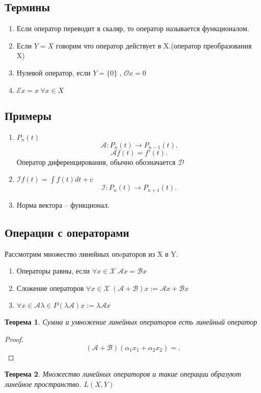 \documentclass{scrartcl}
\newtheorem{theorem}{Теорема}
\begin{document}
\subsection{Термины}
\begin{enumerate}
    \item Если оператор переводит в скаляр, то оператор  называется функционалом.
    \item  Если $Y = X$ говорим что оператор действует в X.(оператор преобразования X)
    \item  Нулевой оператор, если $Y = \{0\}$ ,  $\mathcal{O} x = 0$
    \item  $\mathcal{E} x = x  ~\forall  x \in X$
\end{enumerate}
\subsection{Примеры}
\begin{enumerate}
    \item $P_{n}(t)$
        \[
            \mathcal{A}: P_{n}(t) \to P_{n - 1}(t)
        .\] 
         \[
             \mathcal{A} f(t) = f'(t)
         .\] 
         Оператор диференцирования, обычно обозначается $\mathcal{D}$
         \item  $\mathcal{I} f(t) = \int f(t) dt + c$
             \[
                 \mathcal{I} : P_{n}(t) \to P_{n + 1}(t)
             .\] 
        \item Норма вектора -- функционал.
\end{enumerate}
\subsection{Операции с операторами}
Рассмотрим множество линейных опeраторов из X в Y.
\begin{enumerate}
    \item Операторы равны, если $\forall x \in \mathcal{X}~ \mathcal{A}x = \mathcal{B}x$
    \item Сложение операторов $\forall x \in \mathcal{X} ~( \mathcal{A} + \mathcal{B} ) x := \mathcal{A} x + \mathcal{B} x$
    \item $\forall  x \in \mathcal{A} \lambda \in P (\lambda \mathcal{A}) x := \lambda \mathcal{A} x$
\end{enumerate}
\begin{theorem}
    Сумма и умножение линейных операторов есть линейный оператор
\end{theorem}
\begin{proof}
    \[
        (\mathcal{A} + \mathcal{B}) (\alpha_1 x_1 + \alpha_{2} x_2) = 
    .\] 
\end{proof}
\begin{theorem}
    Множество линейных операторов и такие операции образуют линейное пространство. $L(X,Y)$
\end{theorem}
\end{document}
